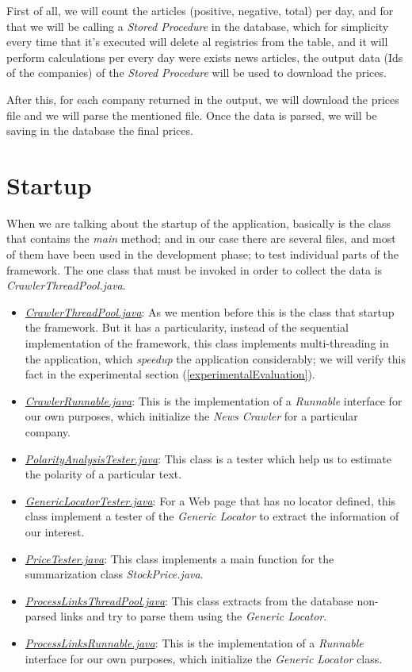 First of all, we will count the articles (positive, negative, total) per day, and for that we will be calling a \emph{Stored Procedure} in the database, which for simplicity every time that it's executed will delete al registries from the table, and it will perform calculations per every day were exists news articles, the output data (Ids of the companies) of the \emph{Stored Procedure} will be used to download the prices. 

After this, for each company returned in the output, we will download the prices file and we will parse the mentioned file. Once the data is parsed, we will be saving in the database the final prices.

\section{Startup}

When we are talking about the startup of the application, basically is the class that contains the \emph{main} method; and in our case there are several files, and most of them have been used in the development phase; to test individual parts of the framework. The one class that must be invoked in order to collect the data is \emph{CrawlerThreadPool.java}.

\begin{itemize}
	\item \emph{\ul{CrawlerThreadPool.java}}: As we mention before this is the class that startup the framework. But it has a particularity, instead of the sequential implementation of the framework, this class implements multi-threading in the application, which \emph{speedup} the application considerably; we will verify this fact in the experimental section (\ref{experimentalEvaluation}).
	\item \emph{\ul{CrawlerRunnable.java}}: This is the implementation of a \emph{Runnable} interface for our own purposes, which initialize the \emph{News Crawler} for a particular company.
	\item \emph{\ul{PolarityAnalysisTester.java}}: This class is a tester which help us to estimate the polarity of a particular text.
	\item \emph{\ul{GenericLocatorTester.java}}: For a Web page that has no locator defined, this class implement a tester of the \emph{Generic Locator} to extract the information of our interest.
	\item \emph{\ul{PriceTester.java}}: This class implements a main function for the summarization class \emph{StockPrice.java}.
	\item \emph{\ul{ProcessLinksThreadPool.java}}: This class extracts from the database non-parsed links and try to parse them using the \emph{Generic Locator}.
	\item \emph{\ul{ProcessLinksRunnable.java}}: This is the implementation of a \emph{Runnable} interface for our own purposes, which initialize the \emph{Generic Locator} class.
\end{itemize}


